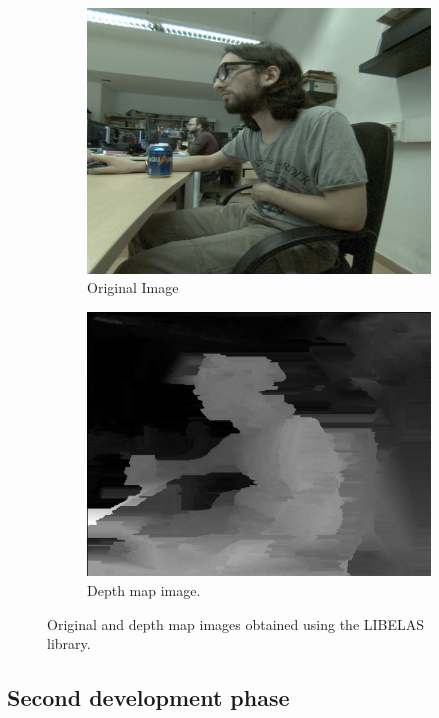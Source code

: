 \documentclass[10pt,a4paper,twocolumn,twoside]{article}
\begin{document}
	\begin{figure}
		\centering
		\begin{subfigure}[b]{1\linewidth}
			\includegraphics[width=\linewidth]{img/4}
			\caption{Original Image}
		\end{subfigure}
		\begin{subfigure}[b]{1\linewidth}
			\includegraphics[width=\linewidth]{img/4b}
			\caption{Depth map image.}
		\end{subfigure}
		\caption{Original and depth map images obtained using the LIBELAS library.}
		\label{fig:depthmap}
	\end{figure}
	
	\subsection{Second development phase}
	
\end{document}
